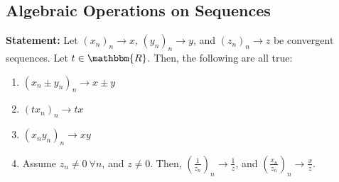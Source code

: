 \documentclass[10pt]{extarticle}
\newcommand{\R}{\mathbbm{R}}
\begin{document}
  \subsection{Algebraic Operations on Sequences}%
  \textbf{Statement:} Let $(x_n)_n\rightarrow x$, $(y_n)_n\rightarrow y$, and $(z_n)_n\rightarrow z$ be convergent sequences. Let $t\in\R$. Then, the following are all true:
    \begin{enumerate}[(1)]
      \item $(x_n \pm y_n)_n \rightarrow x\pm y$
      \item $(tx_n)_n \rightarrow tx$
      \item $(x_ny_n)_n \rightarrow xy$
      \item Assume $z_n \neq 0~\forall n$, and $z\neq 0$. Then, $\left(\frac{1}{z_n}\right)_n \rightarrow \frac{1}{z}$, and $\left(\frac{x_n}{z_n}\right)_n \rightarrow \frac{x}{z}$.
    \end{enumerate}
\end{document}

